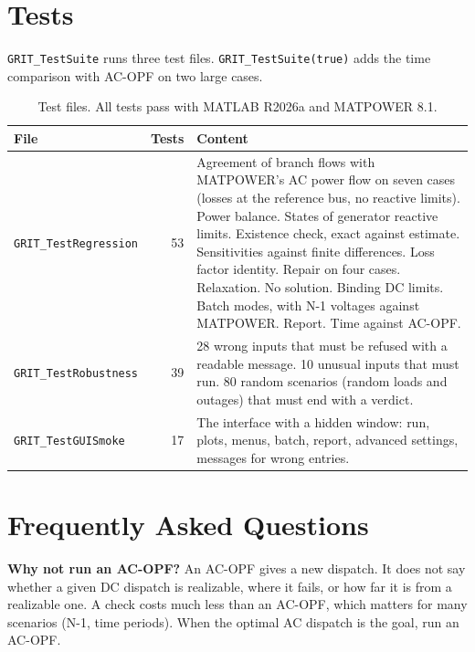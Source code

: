 \documentclass[a4paper,11pt]{article}
\begin{document}
\section{Tests}\label{sec:tests}

\texttt{GRIT\_TestSuite} runs three test files. \texttt{GRIT\_TestSuite(true)} adds the time comparison with AC-OPF on two large cases.

\begin{table}[H]\centering\small
\begin{tabular}{@{}lrp{9.5cm}@{}}
\toprule
\textbf{File} & \textbf{Tests} & \textbf{Content} \\
\midrule
\texttt{GRIT\_TestRegression} & 53 & Agreement of branch flows with MATPOWER's AC power flow on seven cases (losses at the reference bus, no reactive limits). Power balance. States of generator reactive limits. Existence check, exact against estimate. Sensitivities against finite differences. Loss factor identity. Repair on four cases. Relaxation. No solution. Binding DC limits. Batch modes, with N-1 voltages against MATPOWER. Report. Time against AC-OPF. \\
\texttt{GRIT\_TestRobustness} & 39 & 28 wrong inputs that must be refused with a readable message. 10 unusual inputs that must run. 80 random scenarios (random loads and outages) that must end with a verdict. \\
\texttt{GRIT\_TestGUISmoke} & 17 & The interface with a hidden window: run, plots, menus, batch, report, advanced settings, messages for wrong entries. \\
\bottomrule
\end{tabular}
\caption{Test files. All tests pass with MATLAB R2026a and MATPOWER 8.1.}
\end{table}

\section{Frequently Asked Questions}\label{sec:faq}

\textbf{Why not run an AC-OPF?} An AC-OPF gives a new dispatch. It does not say whether a given DC dispatch is realizable, where it fails, or how far it is from a realizable one. A check costs much less than an AC-OPF, which matters for many scenarios (N-1, time periods). When the optimal AC dispatch is the goal, run an AC-OPF.
\end{document}
